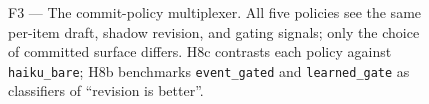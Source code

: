 \begin{figure}[ht]
{%
}
\caption{F3 --- The commit-policy multiplexer. All five policies see the same per-item draft, shadow revision, and gating signals; only the choice of committed surface differs. H8c contrasts each policy against \texttt{haiku\_bare}; H8b benchmarks \texttt{event\_gated} and \texttt{learned\_gate} as classifiers of ``revision is better''.}
\label{fig:flow_commit_policy}
\end{figure}

